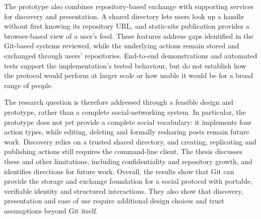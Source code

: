 The prototype also combines repository-based exchange with supporting
services for discovery and presentation. A shared directory lets users
look up a handle without first knowing its repository URL, and static-site
publication provides a browser-based view of a user's feed. These features
address gaps identified in the Git-based systems reviewed, while the
underlying actions remain stored and exchanged through users' repositories.
End-to-end demonstrations and automated tests support the implementation's
tested behaviour, but do not establish how the protocol would perform at
larger scale or how usable it would be for a broad range of people.

The research question is therefore addressed through a feasible design and
prototype, rather than a complete social-networking system. In particular,
the prototype does not yet provide a complete social vocabulary: it
implements four action types, while editing, deleting and formally resharing
posts remain future work. Discovery relies on a trusted shared directory,
and creating, replicating and publishing actions still requires the
command-line client. The thesis discusses these and other
limitations, including confidentiality and repository growth, and identifies
directions for future work. Overall, the results show that Git can provide
the storage and exchange foundation for a social protocol with portable,
verifiable identity and structured interactions. They also show that
discovery, presentation and ease of use require additional design choices
and trust assumptions beyond Git itself.
